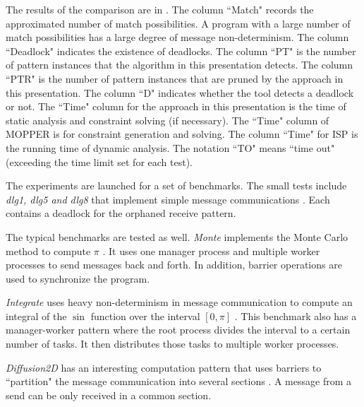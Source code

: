 The results of the comparison are in . The column ``Match" records the approximated number of match possibilities. A program with a large number of match possibilities has a large degree of message non-determinism. The column ``Deadlock" indicates the existence of deadlocks. The column ``PT" is the number of pattern instances that the algorithm in this presentation detects. The column ``PTR" is the number of pattern instances that are pruned by the approach in this presentation. The column ``D" indicates whether the tool detects a deadlock or not. The ``Time" column for the approach in this presentation is the time of static analysis and constraint solving (if necessary). The ``Time" column of MOPPER is for constraint generation and solving. The column ``Time" for ISP is the running time of dynamic analysis. The notation ``TO" means ``time out" (exceeding the time limit set for each test).

 
The experiments are launched for a set of benchmarks. The small tests include \textit{dlg1, dlg5 and dlg8} that implement simple message communications \cite{DBLP:conf/fm/ForejtKNS14}. Each contains a deadlock for the orphaned receive pattern.  

The typical benchmarks are tested as well. \textit{Monte} implements the Monte Carlo method to compute $\pi$ \cite{benchmark:mentoCarlo}. It uses one manager process and multiple worker processes to send messages back and forth. In addition, barrier operations are used to synchronize the program. 

\textit{Integrate} uses heavy non-determinism in message communication to compute an integral of the $\sin$ function over the interval $[0, \pi]$ \cite{benchmark:fevs}. This benchmark also has a manager-worker pattern where the root process divides the interval to a certain number of tasks. It then distributes those tasks to multiple worker processes. 

 
\textit{Diffusion2D} has an interesting computation pattern that uses barriers to ``partition" the message communication into several sections \cite{benchmark:fevs}. A message from a send can be only received in a common section. 

